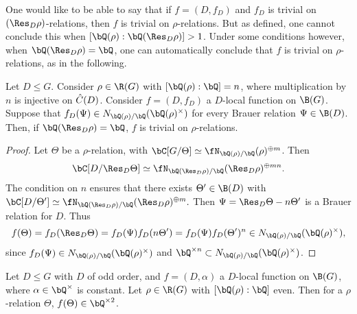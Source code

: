 One would like to be able to say that if $f = (D, f_D)$ and $f_D$ is trivial on $(\Res_D \rho)$-relations, then $f$ is trivial on $\rho$-relations. But as defined, one cannot conclude this when $[\bQ(\rho) : \bQ(\Res_D \rho) ] > 1$. Under some conditions however, when $\bQ(\Res_D \rho) = \bQ$, one can automatically conclude that $f$ is trivial on $\rho$-relations, as in the following.

\begin{prop}\label{rational-res}
Let $D \leq G$. Consider $\rho \in \R(G)$ with $[\bQ(\rho) : \bQ] = n$, where multiplication by $n$ is injective on $\hat{C}(D)$. Consider $f = (D, f_D)$ a $D$-local function on $\B(G)$. 
Suppose that $f_D(\Psi) \in \fieldnorm{\rho}$ for every Brauer relation $\Psi \in \B(D)$.
Then, if $\bQ(\Res_D \rho) = \bQ$, $f$ is trivial on $\rho$-relations.
\end{prop}

\begin{proof}
    Let $\Theta$ be a $\rho$-relation, with $\bC[G / \Theta] \simeq \repnorm{\rho}^{\oplus m}$. Then $$\bC[D / \Res_D \Theta] \simeq \repnorm{\Res_D \rho}^{\oplus m n}.$$ 
    The condition on $n$ ensures that there exists $\Theta' \in \B(D)$ with $\bC[D / \Theta'] \simeq \repnorm{\Res_D \rho}^{\oplus m}.$ Then $\Psi = \Res_D\Theta - n\Theta'$ is a Brauer relation for $D$. Thus
    \[ f(\Theta) = f_D(\Res_D \Theta) = f_D(\Psi)f_D(n\Theta') = f_D(\Psi)f_D(\Theta')^n \in \fieldnorm{\rho}, \]
    since $f_D(\Psi) \in \fieldnorm{\rho}$ and $\bQ^{\times n} \subset \fieldnorm{\rho}$. 
\end{proof}

\begin{prop}\label{const-fns}
     Let $D \leq G$ with $D$ of odd order, and $f = (D, \alpha)$ a $D$-local function on $\B(G)$, where $\alpha \in \bQ^{\times}$ is constant. Let $\rho \in \R(G)$ with $[\bQ(\rho) : \bQ ]$ even. Then for a $\rho$-relation $\Theta$, $f(\Theta) \in \bQ^{\times 2}$. 
\end{prop}

